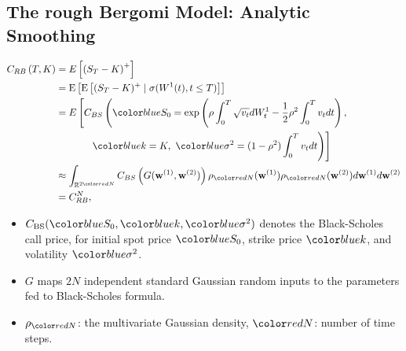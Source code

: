 \documentclass[ima, 20pt, portrait, plainboxedsections]{sciposter}
\begin{document}
\begin{multicols}{3}
\section*{The rough Bergomi Model: Analytic Smoothing}
\begin{align}\label{BS_formula_rbergomi}
C_{RB}\left( T, K \right) &= E\left[ \left(S_T - K \right)^+ \right]  \nonumber\\
&=\expt{\expt{(S_T-K)^+ \mid \sigma(W^1(t) ,t \le T)}}\nonumber \\
&=E\left[C_{BS}\left( \blue{S_0} = \operatorname{exp}\left(\rho \int_0^T \sqrt{v_t} dW_t^1 - \frac{1}{2}
\rho^2 \int_0^T v_t dt\right), \right. \right.\nonumber\\
&\quad \quad \quad \left.\left.\ \blue{k} = K , \ \blue{\sigma^2} = (1-\rho^2)
\int_0^T v_t dt \right) \right]\nonumber\\
&\approx \int_{\rset^{2\red{N}}} C_{BS} \left(G(\mathbf{w}^{(1)},\mathbf{w}^{(2)})\right) \rho_{\red{N}}(\mathbf{w}^{(1)})  \rho_{\red{N}}(\mathbf{w}^{(2)}) d\mathbf{w}^{(1)} d\mathbf{w}^{(2)}\nonumber\\
&=C_{RB}^N \COMMA
\end{align}
\begin{itemize}
\item $C_{\text{BS}}(\blue{S_0},\blue{k},\blue{\sigma^2})$ denotes the Black-Scholes call price, for initial spot price $\blue{S_0}$, strike price $\blue{k}$, and volatility $\blue{\sigma^2}$.
\item $G$ maps $2N$ independent standard Gaussian random inputs to the parameters fed to Black-Scholes formula.
\item $\rho_{\red{N}}$: the multivariate Gaussian density, $\red{N}$: number of time steps.
\end{itemize} 
%
%

\end{multicols}
\end{document}
